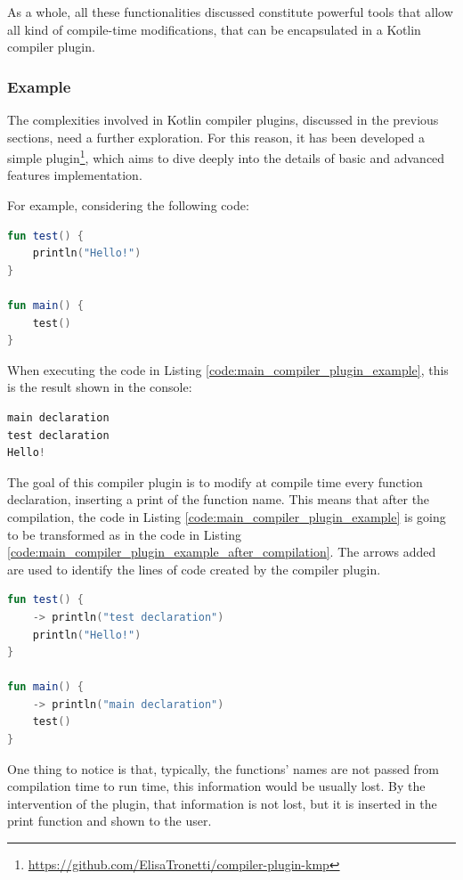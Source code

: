 As a whole, all these functionalities discussed constitute powerful tools that allow all kind of compile-time modifications, that can be encapsulated in a Kotlin compiler plugin.

\subsubsection{Example}\label{section:compiler_plugin_example}
The complexities involved in Kotlin compiler plugins, discussed in the previous sections, need a further exploration. For this reason, it has been developed a simple plugin\footnote{\url{https://github.com/ElisaTronetti/compiler-plugin-kmp}}, which aims to dive deeply into the details of basic and advanced features implementation.

For example, considering the following code:
\begin{lstlisting}[caption={Kotlin code without the modification of the compiler plugin created as an example}, captionpos=b, language=Kotlin, label={code:main_compiler_plugin_example}]
fun test() {
    println("Hello!")
}
    
fun main() {
    test()
}
\end{lstlisting}
When executing the code in Listing \ref{code:main_compiler_plugin_example}, this is the result shown in the console:
\begin{lstlisting}[caption={Output of the execution of Listing \ref{code:main_compiler_plugin_example} with the application of the compiler plugin created as an example}, captionpos=b, language=Kotlin, label={code:output_main_compiler_plugin_example}]
main declaration
test declaration
Hello!
\end{lstlisting}
The goal of this compiler plugin is to modify at compile time every function declaration, inserting a print of the function name. This means that after the compilation, the code in Listing \ref{code:main_compiler_plugin_example} is going to be transformed as in the code in Listing \ref{code:main_compiler_plugin_example_after_compilation}. The arrows added are used to identify the lines of code created by the compiler plugin.
\begin{lstlisting}[caption={Kotlin code with the modification of the compiler plugin created as an example}, captionpos=b, language=Kotlin, escapechar=\$, label={code:main_compiler_plugin_example_after_compilation}]
fun test() {
    -> println("test declaration")
    println("Hello!")
}

fun main() {
    -> println("main declaration")
    test()
}
\end{lstlisting}
One thing to notice is that, typically, the functions' names are not passed from compilation time to run time, this information would be usually lost. By the intervention of the plugin, that information is not lost, but it is inserted in the print function and shown to the user.

